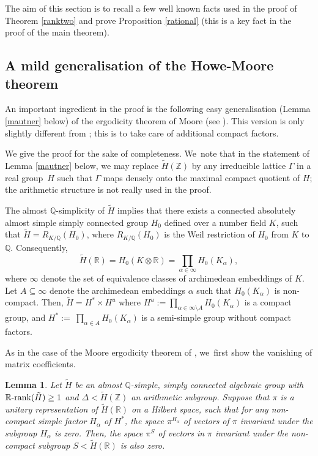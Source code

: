 \documentclass[JEP,XML,SOM,Unicode,published]{cedram}
\newcommand{\Rrank}{\R\textup{-}\rank}
\newtheorem{lemma}{Lemma}
\theoremstyle{definition}
\newcommand{\field}[1]{\mathbb{#1}}
\newcommand{\Q}{\field{Q}}
\newcommand{\R}{\field{R}}
\newcommand{\Z}{\field{Z}}
\newcommand{\rank}{{\operatorname{rank}}}
\let\G\Gamma
\begin{document}
The aim of this section is to recall a few well known facts used in the proof of Theorem \ref{ranktwo} and prove Proposition \ref{rational} (this is a key fact in the proof of the main theorem).

\subsection{A mild generalisation of the Howe-Moore theorem}

An important ingredient in the proof is the following easy generalisation (Lemma \ref{mautner} below) of the ergodicity theorem of Moore (see \cite[Th.\,(2.2.6)]{Z}). This version is only slightly different from \cite[Th.\,(2.2.6)]{Z}; this is to take care of additional compact factors.

We give the proof for the sake of completeness. We~note that in the statement of Lemma \ref{mautner} below,
we may replace $\tilde{H}(\Z)$ by any irreducible lattice $\G$ in a real group~$H$ such that $\G$ maps densely
onto the maximal compact quotient of $H$; the arithmetic structure is not really used in the proof.

The almost $\Q$-simplicity of $\tilde H$ implies that there exists a connected absolutely almost simple simply connected group $H_0$ defined over a number field $K$, such that $\tilde H=R_{K/\Q}(H_0)$,
where $R_{K/\Q}(H_0)$ is the Weil restriction of $H_0$ from $K$ to $\Q$. Consequently,
\[
\tilde H (\R)=H_0(K\otimes \R)=\prod_{\alpha \in \infty} H_0(K_{\alpha}),
\]
where $\infty$ denote the set of equivalence
classes of archimedean embeddings of $K$. Let $A\subseteq\infty$ denote the archimedean embeddings $\alpha$ such that $H_0(K_{\alpha})$ is non-compact. Then, $\tilde H= H^*\times H^u$ where $H^u:=\prod
_{\alpha \in \infty \setminus A} H_0(K_{\alpha })$ is a compact group, and $H^*:= ~\prod_{\alpha \in A} H_0(K_{\alpha})$ is a semi-simple group without compact factors.

As in the case of the Moore ergodicity theorem of \cite{Z}, we~first show the vanishing of matrix coefficients.

\begin{lemma}\label{howemoore} Let $\tilde{H}$ be an almost $\Q$-simple, simply connected algebraic group with $\Rrank(\tilde{H})\geq 1$ and $\Delta < \tilde{H}(\Z)$ an arithmetic subgroup. Suppose that $\pi$ is a unitary representation of $\tilde H(\R)$ on a Hilbert space, such that for any \emph{non-compact} simple factor $H_{\alpha }$ of $H^*$, the space $\pi ^{H_{\alpha }}$ of vectors of $\pi $ invariant under the subgroup $H_{\alpha}$ is zero. Then, the space $\pi ^{S}$ of vectors in $\pi $ invariant under the non-compact subgroup $S<\tilde H(\R)$ is also zero.
\end{lemma}
\end{document}
